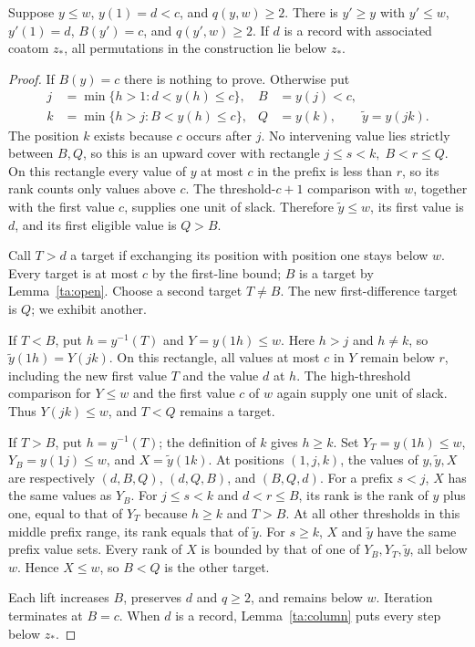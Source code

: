 \begin{lemma}\label{ta:greedy}
Suppose $y\leq w$, $y(1)=d<c$, and $q(y,w)\geq2$.
There is $y'\geq y$ with $y'\leq w$, $y'(1)=d$, $B(y')=c$, and
$q(y',w)\geq2$. If $d$ is a record with associated coatom $z_*$,
all permutations in the construction lie below $z_*$.
\end{lemma}

\begin{proof}
If $B(y)=c$ there is nothing to prove. Otherwise put
\[
 \begin{aligned}
  j&=\min\{h>1:d<y(h)\leq c\},&
  B&=y(j)<c,\\
  k&=\min\{h>j:B<y(h)\leq c\},&
  Q&=y(k),\qquad \widetilde y=y(jk).
 \end{aligned}
\]
The position $k$ exists because $c$ occurs
after $j$. No intervening value lies strictly between $B,Q$, so this
is an upward cover with rectangle
$j\leq s<k,\; B<r\leq Q$.
On this rectangle every value of $y$ at most $c$ in the prefix is
less than $r$, so its rank counts only values above $c$.
The threshold-$c+1$ comparison with $w$, together with the first
value $c$, supplies one unit of slack. Therefore
$\widetilde y\leq w$, its first value is $d$, and its first eligible
value is $Q>B$.

Call $T>d$ a target if exchanging its position with position one
stays below $w$. Every target is at most $c$ by the first-line bound;
$B$ is a target by Lemma~\ref{ta:open}. Choose a second target
$T\neq B$. The new first-difference target is $Q$; we exhibit
another.

If $T<B$, put $h=y^{-1}(T)$ and $Y=y(1h)\leq w$.
Here $h>j$ and $h\neq k$, so $\widetilde y(1h)=Y(jk)$.
On this rectangle, all values at most $c$ in $Y$
remain below $r$, including the new first value $T$ and the value
$d$ at $h$. The high-threshold comparison for $Y\leq w$ and the
first value $c$ of $w$ again supply one unit of slack.
Thus $Y(jk)\leq w$, and $T<Q$ remains a target.

If $T>B$, put $h=y^{-1}(T)$; the definition of $k$ gives $h\geq k$.
Set $Y_T=y(1h)\leq w$, $Y_B=y(1j)\leq w$, and
$X=\widetilde y(1k)$. At positions $(1,j,k)$, the values of
$y,\widetilde y,X$ are respectively $(d,B,Q)$, $(d,Q,B)$, and
$(B,Q,d)$. For a prefix $s<j$, $X$ has the same values as $Y_B$.
For $j\leq s<k$ and $d<r\leq B$, its rank is the rank of $y$
plus one, equal to that of $Y_T$ because $h\geq k$ and $T>B$.
At all other thresholds in this middle prefix range, its rank equals
that of $\widetilde y$. For $s\geq k$, $X$ and $\widetilde y$
have the same prefix value sets. Every rank of $X$ is bounded by
that of one of $Y_B,Y_T,\widetilde y$, all below $w$.
Hence $X\leq w$, so $B<Q$ is the other target.

Each lift increases $B$, preserves $d$ and $q\geq2$, and remains
below $w$. Iteration terminates at $B=c$. When $d$ is a record,
Lemma~\ref{ta:column} puts every step below $z_*$.
\end{proof}

